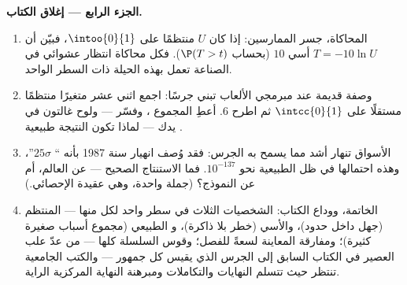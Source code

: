 \begin{problem}
\medskip
\noindent\textbf{الجزء الرابع --- إغلاق الكتاب.}
\begin{enumerate}[resume]
  \item المحاكاة، جسر الممارسين: إذا كان $U$
        منتظمًا على $\intoo{0}{1}$، فبيّن أن
        $T = -10\ln U$ أسي  $10$ (بحساب
        $\P(T > t)$). فكل محاكاة انتظار عشوائي في
        الصناعة تعمل بهذه الحيلة ذات السطر الواحد.
  \item وصفة قديمة عند مبرمجي الألعاب تبني جرسًا: اجمع
        اثني عشر متغيرًا منتظمًا مستقلًا على $\intcc{0}{1}$ ثم
        اطرح $6$. أعطِ  المجموع ،
        وفسّر --- ولوح غالتون في يدك --- لماذا تكون
        النتيجة طبيعية .
  \item الأسواق تنهار أشد مما يسمح به الجرس: فقد وُصف انهيار
        سنة 1987 بأنه `` $25\sigma$''، وهذه
        احتمالها في ظل الطبيعية نحو $10^{-137}$.
        فما الاستنتاج الصحيح --- عن العالم، أم
        عن النموذج؟ (جملة واحدة، وهي عقيدة الإحصائي.)
  \item الخاتمة، ووداع الكتاب: الشخصيات الثلاث
        في سطر واحد لكل منها --- المنتظم (جهل
        داخل حدود)، والأسي (خطر بلا ذاكرة)، و
        الطبيعي (مجموع أسباب صغيرة كثيرة)؛ ومفارقة المعاينة
        لسعةً للفصل؛ وقوس السلسلة
        كلها --- من عدّ علب العصير في الكتاب السابق إلى
         الجرس الذي يقيس كل جمهور --- والكتب
        الجامعية تنتظر حيث تتسلم النهايات
        والتكاملات ومبرهنة النهاية المركزية الراية.
\end{enumerate}
\end{problem}
